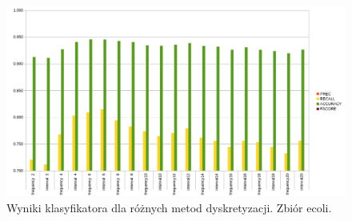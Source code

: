 \begin{figure}[H]
	\centering
		\includegraphics[width=1.0\linewidth]{disc_ecoli.png}
	\caption[Wyniki klasyfikatora dla różnych metod dyskretyzacji. Zbiór ecoli.]{Wyniki klasyfikatora dla różnych metod dyskretyzacji. Zbiór ecoli.}
	\label{fig:disc_ecoli}
\end{figure}

